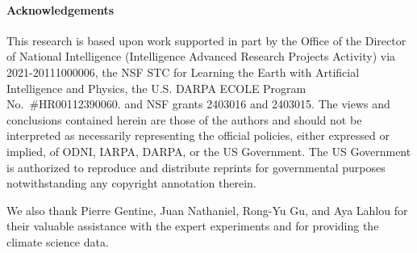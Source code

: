 \paragraph{Acknowledgements}
This research is based upon work supported in part by the Office of the Director of National Intelligence (Intelligence Advanced Research Projects Activity) via 2021-20111000006, the NSF STC for Learning the Earth with Artificial Intelligence and Physics, the U.S. DARPA ECOLE Program No.\ \#HR00112390060. and NSF grants 2403016 and 2403015.
The views and conclusions contained herein are those of the authors and should not be interpreted as necessarily representing the official policies, either expressed or implied, of ODNI, IARPA, DARPA, or the US Government. The US Government is authorized to reproduce and distribute reprints for governmental purposes notwithstanding any copyright annotation therein.


We also thank Pierre Gentine, Juan Nathaniel, Rong-Yu Gu, and Aya Lahlou for their valuable assistance with the expert experiments and for providing the climate science data.
